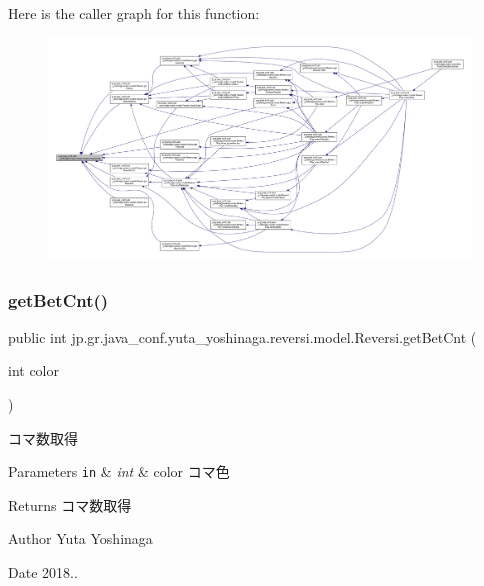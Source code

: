 Here is the caller graph for this function\+:
\nopagebreak
\begin{figure}[H]
\begin{center}
\leavevmode
\includegraphics[width=350pt]{classjp_1_1gr_1_1java__conf_1_1yuta__yoshinaga_1_1reversi_1_1model_1_1_reversi_afbad8b2c3b2423a7490f9a3b636584d3_icgraph}
\end{center}
\end{figure}
\mbox{\label{classjp_1_1gr_1_1java__conf_1_1yuta__yoshinaga_1_1reversi_1_1model_1_1_reversi_a9f826e110ec3298a6bc5d6987a94519c}} 
\subsubsection{\texorpdfstring{get\+Bet\+Cnt()}{getBetCnt()}}
{\footnotesize\ttfamily public int jp.\+gr.\+java\+\_\+conf.\+yuta\+\_\+yoshinaga.\+reversi.\+model.\+Reversi.\+get\+Bet\+Cnt (\begin{DoxyParamCaption}\item[{int}]{color }\end{DoxyParamCaption})}



コマ数取得 


\begin{DoxyParams}[1]{Parameters}
\mbox{\tt in}  & {\em int} & color コマ色 \\
\hline
\end{DoxyParams}
\begin{DoxyReturn}{Returns}
コマ数取得 
\end{DoxyReturn}
\begin{DoxyAuthor}{Author}
Yuta Yoshinaga 
\end{DoxyAuthor}
\begin{DoxyDate}{Date}
2018.. 
\end{DoxyDate}


